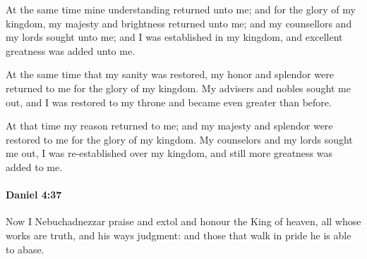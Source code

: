 			\begin{versebox}
					\item[BHS] 
					\item[ASV] At the same time mine understanding returned unto me; and for the glory of my kingdom, my majesty and brightness returned unto me; and my counsellors and my lords sought unto me; and I was established in my kingdom, and excellent greatness was added unto me.
					\item[NIV] At the same time that my sanity was restored, my honor and splendor were returned to me for the glory of my kingdom. My advisers and nobles sought me out, and I was restored to my throne and became even greater than before.
					\item[NRSV] At that time my reason returned to me; and my majesty and splendor were restored to me for the glory of my kingdom. My counselors and my lords sought me out, I was re-established over my kingdom, and still more greatness was added to me.
			\end{versebox}

		\paragraph{Daniel 4:37} %
			\label{DANIEL-4-37}

			Now I Nebuchadnezzar praise and extol and honour the King of heaven, all whose works are truth, and his ways judgment: and those that walk in pride he is able to abase.


